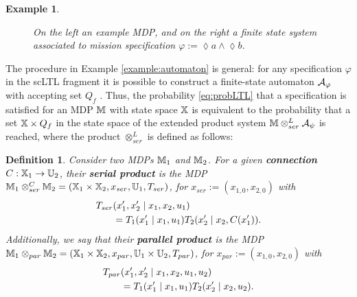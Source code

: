 \documentclass[conference]{IEEEtran}
\renewcommand{\cite}[1]{\citep{#1}}
\newtheorem{definition}{Definition}
\newtheorem{example}{Example}
\begin{document}
\begin{example}
\begin{figure}[htp]
	\caption{On the left an example MDP, and on the right a finite state system associated to mission specification $\varphi:= \lozenge a \wedge \lozenge b$.  }
  \label{fig:specautomaton}
\end{figure}
\end{example}

The procedure in Example \ref{example:automaton} is general: for any specification $\varphi$ in the scLTL fragment it is possible to construct a finite-state automaton $\mathcal{A}_\varphi$ with accepting set $Q_f$ \cite{Belta2017}. Thus, the probability \eqref{eq:probLTL} that a specification is satisfied for an MDP $\mathbb{M}$ with state space $\mathbb{X}$ is equivalent to the probability that a set $\mathbb{X}\times Q_f$ in the state space of the extended product system $\mathbb{M} \otimes_{ser}^L \mathcal{A}_\psi$ is reached, where the product $\otimes_{ser}^L$ is defined as follows:
\begin{definition} Consider two MDPs  $\mathbb{M}_1$ and $\mathbb{M}_2$. For a given \textbf{connection} $C : \mathbb{X}_1 \rightarrow \mathbb{U}_2$, their \textbf{serial product} is the MDP $\mathbb{M}_1 \otimes_{ser}^C \mathbb{M}_2 = (\mathbb{X}_1 \times \mathbb{X}_2, x_{ser}, \mathbb{U}_1, T_{ser})$, for $x_{ser}:= (x_{1,0},x_{2,0})$
  with
  \begin{equation}\label{eq:serial}
  \begin{aligned}
      \tr_{ser}&(x_1', x_2' \mid x_1, x_2, u_1) \\
      & = \tr_1 (x_1' \mid x_1, u_1) \tr_2 (x_2' \mid x_2, C(x_1') ).
  \end{aligned}
  \end{equation}
  Additionally, we say that their  \textbf{parallel product} is the MDP $\mathbb{M}_1 \otimes_{par} \mathbb{M}_2 = (\mathbb{X}_1 \times \mathbb{X}_2, x_{par}, \mathbb{U}_1 \times \mathbb{U}_2, T_{par})$,  for $x_{par}:= (x_{1,0},x_{2,0})$ with
  \begin{equation}
  \begin{aligned}
      T_{par}&(x_1', x_2' \mid x_1, x_2, u_1, u_2) \\
      & = T_1 (x_1' \mid x_1, u_1) T_2 (x_2' \mid x_2, u_2).
  \end{aligned}
  \end{equation}
\end{definition}
\end{document}

